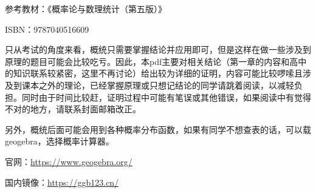     参考教材：《概率论与数理统计（第五版）》
    
    ISBN：9787040516609
    
    只从考试的角度来看，概统只需要掌握结论并应用即可，但是这样在做一些涉及到原理的题目可能会比较吃亏。因此，本pdf主要对相关结论（第一章的内容和高中的知识联系较紧密，这里不再讨论）给出较为详细的证明，内容可能比较啰嗦且涉及到课本之外的理论，已经掌握原理或只想记结论的同学请跳着阅读，以减轻负担。同时由于时间比较赶，证明过程中可能有笔误或其他错误，如果阅读中有觉得不对的地方，请联系封面邮箱改正。

    另外，概统后面可能会用到各种概率分布函数，如果有同学不想查表的话，可以载geogebra，选择概率计算器。
    
    官网：\url{https://www.geogebra.org/}
    
    国内镜像：\url{https://ggb123.cn/}